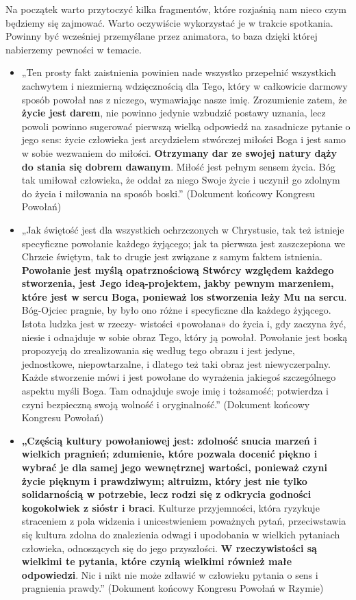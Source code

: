 \documentclass[a5paper,10pt,polish]{book}
\begin{document}
Na początek warto przytoczyć kilka fragmentów, które rozjaśnią nam nieco czym będziemy się zajmować.  Warto oczywiście wykorzystać je w trakcie spotkania. Powinny być wcześniej przemyślane  przez animatora, to baza dzięki której nabierzemy pewności w temacie.
\begin{itemize}
\item {} 
„Ten prosty fakt zaistnienia powinien nade wszystko przepełnić wszystkich zachwytem i niezmierną wdzięcznością dla Tego, który w całkowicie darmowy sposób powołał nas z niczego, wymawiając nasze imię. Zrozumienie zatem, że \textbf{życie jest darem}, nie powinno jedynie wzbudzić postawy uznania, lecz powoli powinno sugerować pierwszą wielką odpowiedź na zasadnicze pytanie o jego sens: życie człowieka jest arcydziełem stwórczej miłości Boga i jest samo w sobie wezwaniem  do miłości. \textbf{Otrzymany dar  ze swojej  natury  dąży  do stania  się dobrem dawanym}. Miłość jest pełnym sensem życia. Bóg tak umiłował człowieka, że oddał za niego Swoje życie i uczynił go zdolnym do życia i miłowania na sposób boski.” (Dokument końcowy Kongresu Powołań)

\item {} 
„Jak świętość jest dla wszystkich ochrzczonych w Chrystusie, tak też istnieje specyficzne powołanie każdego żyjącego; jak ta pierwsza jest zaszczepiona we Chrzcie świętym, tak to drugie jest związane z samym faktem istnienia. \textbf{Powołanie jest myślą opatrznościową Stwórcy względem każdego stworzenia, jest Jego ideą-projektem, jakby pewnym  marzeniem,  które  jest w sercu Boga, ponieważ los stworzenia leży Mu na sercu}. Bóg-Ojciec pragnie, by było ono różne i specyficzne dla każdego żyjącego. Istota ludzka jest w rzeczy- wistości «powołana» do życia i, gdy zaczyna żyć, niesie i odnajduje w sobie obraz Tego, który ją powołał. Powołanie jest boską propozycją do zrealizowania  się według tego obrazu i jest  jedyne,  jednostkowe, niepowtarzalne,  i dlatego też taki  obraz jest niewyczerpalny. Każde stworzenie mówi i jest powołane do wyrażenia jakiegoś  szczególnego aspektu myśli Boga. Tam odnajduje swoje imię i tożsamość; potwierdza i czyni bezpieczną swoją wolność i oryginalność.” (Dokument końcowy Kongresu Powołań)

\item {} 
\textbf{„Częścią  kultury powołaniowej  jest: zdolność snucia marzeń i wielkich pragnień; zdumienie, które pozwala docenić piękno i wybrać  je dla samej jego wewnętrznej wartości, ponieważ czyni życie pięknym  i prawdziwym;  altruizm, który  jest nie tylko solidarnością w potrzebie, lecz rodzi się z odkrycia godności kogokolwiek z sióstr i braci}. Kulturze przyjemności, która ryzykuje straceniem z pola widzenia i unicestwieniem poważnych pytań, przeciwstawia się kultura zdolna do znalezienia odwagi i upodobania w wielkich pytaniach człowieka, odnoszących  się do jego przyszłości. \textbf{W rzeczywistości są wielkimi  te pytania,  które czynią wielkimi  również małe  odpowiedzi}. Nic i nikt  nie może zdławić w człowieku pytania o sens i pragnienia prawdy.” (Dokument końcowy Kongresu Powołań w Rzymie)

\end{itemize}
\end{document}
